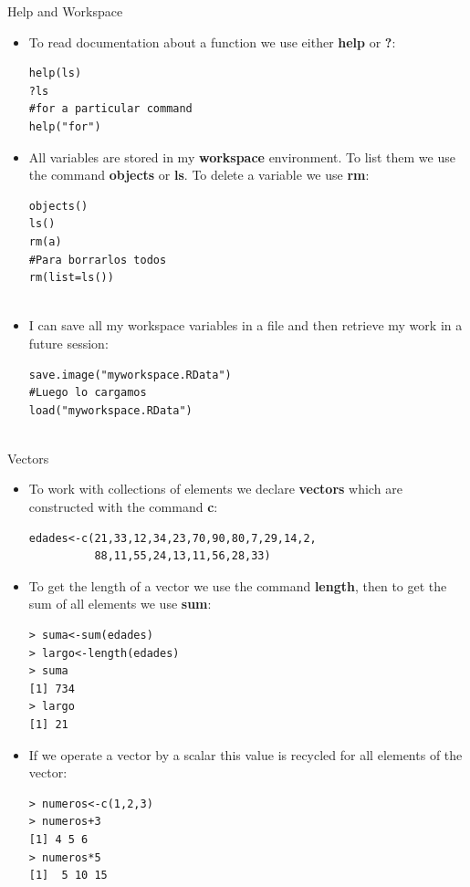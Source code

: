 \documentclass[handout]{beamer}
\begin{document}
\begin{frame}[fragile]{Help and Workspace}
\scriptsize{
\begin{itemize}
 \item To read documentation about a function we use either \textbf{help} or \textbf{?}:
\begin{verbatim}
help(ls)
?ls
#for a particular command
help("for")
\end{verbatim}

\item All variables are stored in my \textbf{workspace} environment. To list them we use the command \textbf{objects} or \textbf{ls}. To delete a variable we use \textbf{rm}:

\begin{verbatim}
objects()
ls()
rm(a)
#Para borrarlos todos
rm(list=ls())
 
\end{verbatim}


\item I can save all my workspace variables in a file and then retrieve my work in a future session:
\begin{verbatim}
save.image("myworkspace.RData")
#Luego lo cargamos
load("myworkspace.RData")
 
\end{verbatim}


 
 
 
 \end{itemize}



}
 
 
\end{frame}

\begin{frame}[fragile]{Vectors}
\scriptsize{
\begin{itemize}
 \item To work with collections of elements we declare \textbf{vectors} which are constructed with the command \textbf{c}:
 \begin{verbatim}
edades<-c(21,33,12,34,23,70,90,80,7,29,14,2,
          88,11,55,24,13,11,56,28,33)
 \end{verbatim}
 \item To get the length of a vector we use the command \textbf{length}, then to get the sum of all elements we use \textbf{sum}:
 \begin{verbatim}
> suma<-sum(edades)
> largo<-length(edades)
> suma
[1] 734
> largo
[1] 21
 \end{verbatim}
 
\item If we operate a vector by a scalar this value is recycled for all elements of the vector:
 \begin{verbatim}
> numeros<-c(1,2,3)
> numeros+3
[1] 4 5 6
> numeros*5
[1]  5 10 15
 \end{verbatim}
\end{itemize}




}
 
 
\end{frame}
\end{document}
